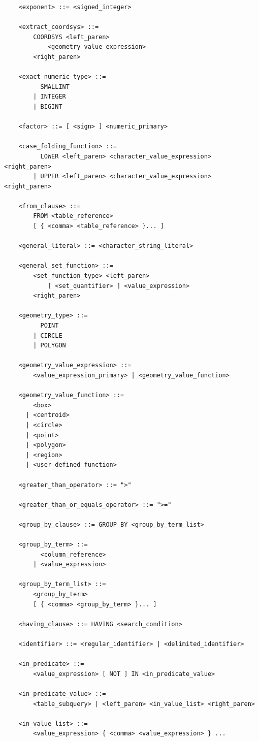 \documentclass[11pt,a4paper]{ivoa}
\begin{document}
\begin{verbatim}
    <exponent> ::= <signed_integer>

    <extract_coordsys> ::=
        COORDSYS <left_paren>
            <geometry_value_expression>
        <right_paren>
    
    <exact_numeric_type> ::=
          SMALLINT
        | INTEGER
        | BIGINT

    <factor> ::= [ <sign> ] <numeric_primary>

    <case_folding_function> ::=
          LOWER <left_paren> <character_value_expression> <right_paren>
        | UPPER <left_paren> <character_value_expression> <right_paren>

    <from_clause> ::=
        FROM <table_reference>
	    [ { <comma> <table_reference> }... ]

    <general_literal> ::= <character_string_literal>

    <general_set_function> ::=
        <set_function_type> <left_paren>
            [ <set_quantifier> ] <value_expression>
        <right_paren>

    <geometry_type> ::=
          POINT
        | CIRCLE
        | POLYGON

    <geometry_value_expression> ::=
        <value_expression_primary> | <geometry_value_function>

    <geometry_value_function> ::=
        <box>
      | <centroid>
      | <circle>
      | <point>
      | <polygon>
      | <region>
      | <user_defined_function>

    <greater_than_operator> ::= ">"

    <greater_than_or_equals_operator> ::= ">="

    <group_by_clause> ::= GROUP BY <group_by_term_list>

    <group_by_term> ::=
          <column_reference>
        | <value_expression>

    <group_by_term_list> ::=
        <group_by_term>
        [ { <comma> <group_by_term> }... ]

    <having_clause> ::= HAVING <search_condition>

    <identifier> ::= <regular_identifier> | <delimited_identifier>

    <in_predicate> ::=
        <value_expression> [ NOT ] IN <in_predicate_value>

    <in_predicate_value> ::=
        <table_subquery> | <left_paren> <in_value_list> <right_paren>

    <in_value_list> ::=
        <value_expression> { <comma> <value_expression> } ...


\end{verbatim}
\end{document}
